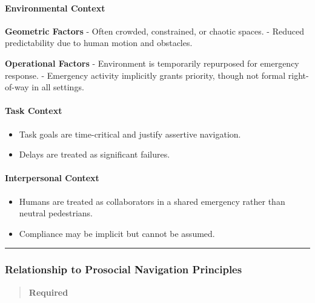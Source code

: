 \documentclass[utf8]{frontiers_suppmat} %
\providecommand{\tightlist}{%
  \setlength{\itemsep}{0pt}\setlength{\parskip}{0pt}}
\begin{document}
\paragraph{Environmental Context}\label{environmental-context}

\textbf{Geometric Factors} - Often crowded, constrained, or chaotic
spaces. - Reduced predictability due to human motion and obstacles.

\textbf{Operational Factors} - Environment is temporarily repurposed for
emergency response. - Emergency activity implicitly grants priority,
though not formal right-of-way in all settings.

\paragraph{Task Context}\label{task-context}

\begin{itemize}
\tightlist
\item
  Task goals are time-critical and justify assertive navigation.
\item
  Delays are treated as significant failures.
\end{itemize}

\paragraph{Interpersonal Context}\label{interpersonal-context}

\begin{itemize}
\tightlist
\item
  Humans are treated as collaborators in a shared emergency rather than
  neutral pedestrians.
\item
  Compliance may be implicit but cannot be assumed.
\end{itemize}

\begin{center}\rule{0.5\linewidth}{0.5pt}\end{center}

\subsubsection{Relationship to Prosocial Navigation
Principles}\label{relationship-to-prosocial-navigation-principles}

\begin{quote}
\textbf{Required}
\end{quote}
\end{document}
